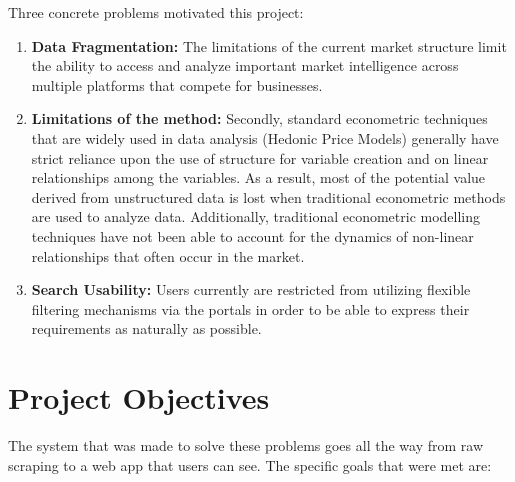 Three concrete problems motivated this project:

\begin{enumerate}
    \item \textbf{Data Fragmentation:} The limitations of the current market structure limit the ability to access and analyze important market intelligence across multiple platforms that compete for businesses.
    \item \textbf{Limitations of the method:} Secondly, standard econometric techniques that are widely used in data analysis (Hedonic Price Models) generally have strict reliance upon the use of structure for variable creation and on linear relationships among the variables. As a result, most of the potential value derived from unstructured data is lost when traditional econometric methods are used to analyze data. Additionally, traditional econometric modelling techniques have not been able to account for the dynamics of non-linear relationships that often occur in the market.
    \item \textbf{Search Usability:} Users currently are restricted from utilizing flexible filtering mechanisms via the portals in order to be able to express their requirements as naturally as possible.
\end{enumerate}

\section{Project Objectives}

The system that was made to solve these problems goes all the way from raw scraping to a web app that users can see. The specific goals that were met are:

